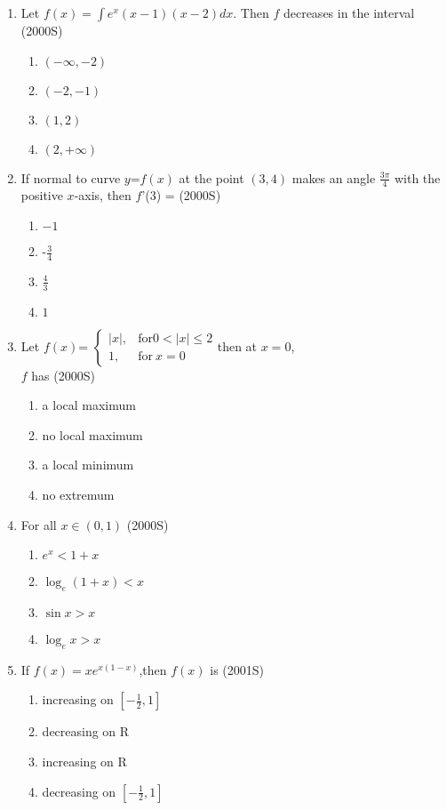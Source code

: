 \documentclass[journal,12pt,twocolumn]{IEEEtran}
\theoremstyle{remark}
\begin{document}
\begin{enumerate}
\item Let $f(x)=\int e^x(x-1)(x-2)dx$. Then $f$ decreases in the interval 
\hfill {(2000S)}
\begin{enumerate}
    \item $(-\infty,-2)$
    \item $(-2,-1)$
    \item $(1,2)$
    \item $(2,+\infty)$\\
\end{enumerate}
\item If normal to curve $y$=$f(x)$ at the point $(3,4)$ makes an angle $\displaystyle\frac{3\pi}{4}$ with the positive $x$-axis, then $f$'(3) = \hfill(2000S)
\begin{enumerate}
    \item $-1$
    \item -$\displaystyle\frac{3}{4}$\\
    \item $\displaystyle\frac{4}{3}$
    \item $1$
\end{enumerate}
\item Let $f(x)$=
$\begin{cases}
|x|, & \text{for}  0<|x| \leq 2\\ 
1, & \text{for}\  x=0
\end{cases}$then at $x=0$, \\$f$ has
\hfill {(2000S)}
\begin{enumerate}
    \item a local maximum
    \item no local maximum
    \item a local minimum
    \item no extremum\\
\end{enumerate}
\item For all $x\in(0,1)$
\hfill {(2000S)}
\begin{enumerate}
    \item $e^x <1+x$
    \item $\log_e (1+x) < x$
    \item $ \sin x > x$
    \item $ \log_e x > x $\\
\end{enumerate}
\item If $f(x)=xe^{x(1-x)}$,then $f(x)$ is 
\hfill {(2001S)}
\begin{enumerate}
    \item increasing on $\left[-\displaystyle\frac{1}{2},1\right]$\\
    \item decreasing on R
    \item increasing on R
    \item decreasing on $\left[-\displaystyle\frac{1}{2},1\right]$\\\\
\end{enumerate}


\end{enumerate}
\end{document}
